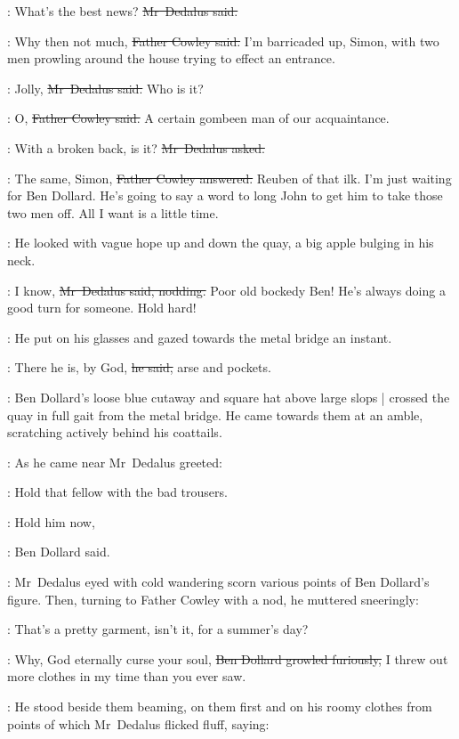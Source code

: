 \simon:
What's the best news?
\sout{Mr~Dedalus said.}

\cowley:
Why then not much,
\sout{Father Cowley said.}
I'm barricaded up, Simon,
with two men prowling around the house
trying to effect an entrance.

\simon:
Jolly,
\sout{Mr~Dedalus said.}
Who is it?

\cowley:
O,
\sout{Father Cowley said.}%
A certain gombeen man of our acquaintance.

\simon:
With a broken back, is it?
\sout{Mr~Dedalus asked.}

\cowley:
The same, Simon,
\sout{Father Cowley answered.}
Reuben of that ilk.
I'm just waiting for Ben Dollard.
He's going to say a word to long John
to get him to take those two men off.
All I want is a little time.

:
He looked with vague hope up and down the quay,
a big apple bulging in his neck.

\simon:
I know,
\sout{Mr~Dedalus said, nodding.}
Poor old bockedy Ben!
He's always doing a good turn for someone.
Hold hard!

:
He put on his glasses
and gazed towards the metal bridge an instant.

\simon:
There he is, by God,
\sout{he said,}%
arse and pockets.

:
Ben Dollard's loose blue cutaway and square hat above large slops |
crossed the quay in full gait
from the metal bridge.
He came towards them at an amble,
scratching actively behind his coattails.

:
As he came near
Mr~Dedalus greeted:

\simon:
Hold that fellow with the bad trousers.

\dollard:
Hold him now,

:
Ben Dollard said.

:
Mr~Dedalus eyed with cold wandering scorn
various points of Ben Dollard's figure.
Then,
turning to Father Cowley with a nod,
he muttered sneeringly:

\simon:
That's a pretty garment, isn't it,%
for a summer's day?

\dollard:
Why, God eternally curse your soul,
\sout{Ben Dollard growled furiously,}
I threw out more clothes in my time than you ever saw.

:
He stood beside them beaming,
on them first and on his roomy clothes
from points of which Mr~Dedalus flicked fluff,
saying:


